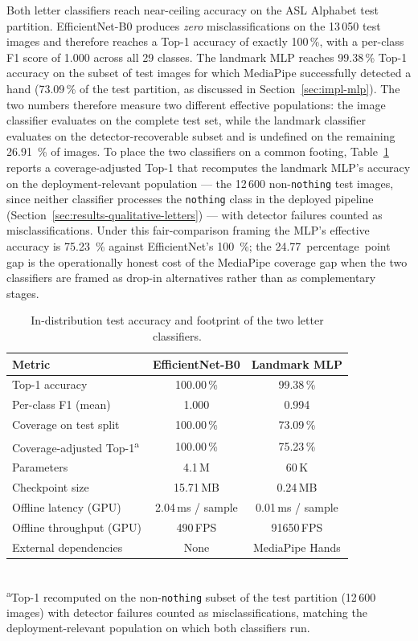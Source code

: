 Both letter classifiers reach near-ceiling
accuracy on the ASL Alphabet test partition. EfficientNet-B0 produces
\emph{zero} misclassifications on the 13\,050 test images and therefore
reaches a Top-1 accuracy of exactly 100\,\%, with a per-class F1 score
of 1.000 across all 29 classes. The landmark MLP reaches 99.38\,\%
Top-1 accuracy on the subset of test images for which MediaPipe
successfully detected a hand (73.09\,\% of the test partition, as
discussed in Section~\ref{sec:impl-mlp}). The two numbers therefore
measure two different effective populations: the image classifier
evaluates on the complete test set, while the landmark classifier
evaluates on the detector-recoverable subset and is undefined on the
remaining \SI{26.91}{\percent} of images. To place the two classifiers
on a common footing, Table~\ref{tab:results-letters} reports a
coverage-adjusted Top-1 that recomputes the landmark MLP's accuracy on
the deployment-relevant population --- the 12\,600 non-\texttt{nothing}
test images, since neither classifier processes the \texttt{nothing}
class in the deployed pipeline (Section~\ref{sec:results-qualitative-letters})
--- with detector failures counted as misclassifications. Under this
fair-comparison framing the MLP's effective accuracy is
\SI{75.23}{\percent} against EfficientNet's \SI{100}{\percent}; the
\SI{24.77}{percentage point} gap is the operationally honest cost of
the MediaPipe coverage gap when the two classifiers are framed as
drop-in alternatives rather than as complementary stages.

\begin{table}[!ht]
\centering
\caption{In-distribution test accuracy and footprint of the two letter classifiers.}
\label{tab:results-letters}
\begin{tabular}{lcc}
\toprule
\textbf{Metric} & \textbf{EfficientNet-B0} & \textbf{Landmark MLP} \\
\midrule
Top-1 accuracy           & 100.00\,\%         & 99.38\,\% \\
Per-class F1 (mean)      & 1.000               & 0.994 \\
Coverage on test split   & 100.00\,\%         & 73.09\,\% \\
Coverage-adjusted Top-1\textsuperscript{a} & 100.00\,\% & 75.23\,\% \\
Parameters               & 4.1\,M              & 60\,K \\
Checkpoint size          & 15.71\,MB          & 0.24\,MB \\
Offline latency (GPU)    & 2.04\,ms / sample  & 0.01\,ms / sample \\
Offline throughput (GPU) & 490\,FPS            & \num{91650}\,FPS \\
External dependencies    & None                & MediaPipe Hands \\
\bottomrule
\end{tabular}
\\[0.4em]
\footnotesize\textsuperscript{a}Top-1 recomputed on the non-\texttt{nothing} subset of the test partition (12\,600 images) with detector failures counted as misclassifications, matching the deployment-relevant population on which both classifiers run.
\end{table}

